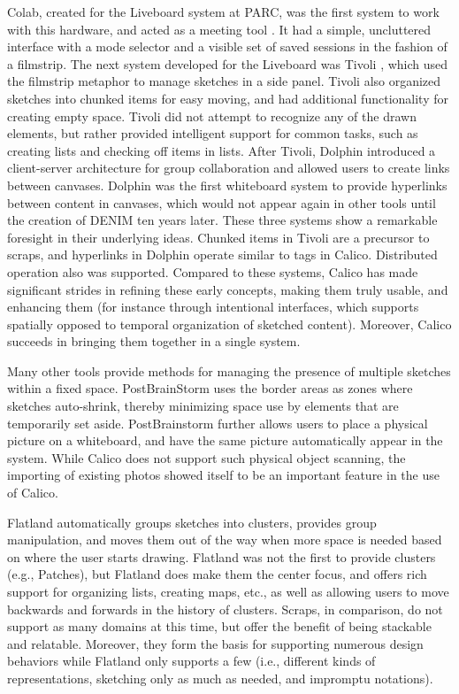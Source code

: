 Colab, created for the Liveboard system at PARC, was the first system to work with this hardware, and acted as a meeting tool \citep{Stefik}. It had a simple, uncluttered interface with a mode selector and a visible set of saved sessions in the fashion of a filmstrip. The next system developed for the Liveboard was Tivoli \citep{Pederson}, which used the filmstrip metaphor to manage sketches in a side panel. Tivoli also organized sketches into chunked items for easy moving, and had additional functionality for creating empty space. Tivoli did not attempt to recognize any of the drawn elements, but rather provided intelligent support for common tasks, such as creating lists and checking off items in lists. After Tivoli, Dolphin \citep{Streitz:1994:DIM:192844.193044} introduced a client-server architecture for group collaboration and allowed users to create links between canvases. Dolphin was the first whiteboard system to provide hyperlinks between content in canvases, which would not appear again in other tools until the creation of DENIM ten years later. These three systems show a remarkable foresight in their underlying ideas. Chunked items in Tivoli are a precursor to scraps, and hyperlinks in Dolphin operate similar to tags in Calico. Distributed operation also was supported. Compared to these systems, Calico has made significant strides in refining these early concepts, making them truly usable, and enhancing them (for instance through intentional interfaces, which supports spatially opposed to temporal organization of sketched content). Moreover, Calico succeeds in bringing them together in a single system.

Many other tools provide methods for managing the presence of multiple sketches within a fixed space. PostBrainStorm \citep{guimbretiere2001fluid} uses the border areas as zones where sketches auto-shrink, thereby minimizing space use by elements that are temporarily set aside. PostBrainstorm further allows users to place a physical picture on a whiteboard, and have the same picture automatically appear in the system. While Calico does not support such physical object scanning, the importing of existing photos showed itself to be an important feature in the use of Calico. 

Flatland \citep{mynatt1999flatland} automatically groups sketches into clusters, provides group manipulation, and moves them out of the way when more space is needed based on where the user starts drawing. Flatland was not the first to provide clusters (e.g., Patches), but Flatland does make them the center focus, and offers rich support for organizing lists, creating maps, etc., as well as allowing users to move backwards and forwards in the history of clusters. Scraps, in comparison, do not support as many domains at this time, but offer the benefit of being stackable and relatable. Moreover, they form the basis for supporting numerous design behaviors while Flatland only supports a few (i.e., different kinds of representations, sketching only as much as needed, and impromptu notations).

